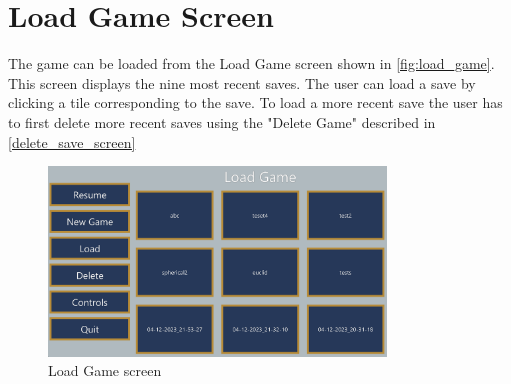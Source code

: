 \section{Load Game Screen}
The game can be loaded from the Load Game screen shown in \autoref{fig:load_game}.
This screen displays the nine most recent saves.
The user can load a save by clicking a tile corresponding to the save.
To load a more recent save the user has to first delete more recent saves using the "Delete Game" described in \autoref{delete_save_screen}

\begin{figure}[!htb]
    \centering
    \includegraphics[width=0.8\textwidth]{chapters/user_manual/resources/load-game.png}
    \caption{Load Game screen}
    \label{fig:load_game}
\end{figure}